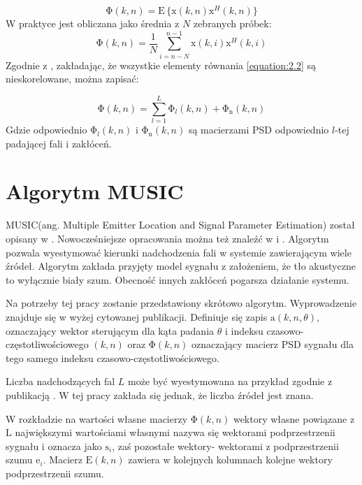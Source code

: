 \begin{equation}
    \label{equation:PSD matrix}
    \bm{\mathrm{\Phi}}(k,n) = \mathrm{E} \, \{\bm{\mathrm{x}}(k,n) \bm{\mathrm{x}}^{H}(k,n)\}
\end{equation}
W praktyce jest obliczana jako średnia z $N$ zebranych próbek:
\begin{equation}
    \label{equation: PSD in practice}
    \bm{\mathrm{\Phi}}(k,n)=
    \dfrac{1}{N} \sum_{i = n-N}^{n-1}
    \bm{\mathrm{x}}(k,i) \bm{\mathrm{x}}^{H}(k,i)
\end{equation}
Zgodnie z \cite{Thiergart2013}, zakładając, że wszystkie elementy równania \eqref{equation:2.2} są nieskorelowane, można zapisać:

\begin{equation}
    \label{equation:PSD signal noise}
    \bm{\mathrm{\Phi}}(k,n) = 
    \sum_{l=1}^{L} \bm{\mathrm{\Phi}}_{l}(k,n) +
    \bm{\mathrm{\Phi}}_{\mathrm{n}}(k,n)
\end{equation}
Gdzie odpowiednio $\bm{\mathrm{\Phi}}_{l}(k,n)$ i $\bm{\mathrm{\Phi}}_{\mathrm{n}}(k,n)$ są macierzami PSD odpowiednio $l$-tej padającej fali i zakłóceń.

\section{Algorytm MUSIC}

MUSIC(ang. Multiple Emitter Location and Signal Parameter Estimation) został opisany w \cite{Schmidt1986}. Nowocześniejsze opracowania można też znaleźć w \cite{DOA} i \cite{Benesty2008}. Algorytm pozwala wyestymować kierunki nadchodzenia fali w systemie zawierającym wiele źródeł. Algorytm zakłada przyjęty model sygnału z założeniem, że tło akustyczne to wyłącznie biały szum. Obecność innych zakłóceń pogarsza działanie systemu.

\noindent Na potrzeby tej pracy zostanie przedstawiony skrótowo algorytm. Wyprowadzenie znajduje się w wyżej cytowanej publikacji. 
Definiuje się zapis $\bm{\mathrm{a}}(k,n,\theta)$, oznaczający wektor sterującym dla kąta padania $\theta$ i indeksu czasowo-częstotliwościowego $(k,n)$ oraz $\bm{\mathrm{\Phi}}(k,n)$ oznaczający macierz PSD sygnału dla tego samego indeksu czasowo-częstotliwościowego.

\noindent Liczba nadchodzących fal $L$ może być wyestymowana na przykład zgodnie z publikacją \cite{n_src}. W tej pracy zakłada się jednak, że liczba źródeł jest znana.

\noindent W rozkładzie na wartości własne macierzy $\bm{\mathrm{\Phi}}(k,n)$ wektory własne powiązane z L największymi wartościami własnymi nazywa się wektorami podprzestrzenii sygnału i oznacza jako $\bm{\mathrm{s}}_{i}$, zaś pozostałe wektory- wektorami z podprzestrzenii szumu $\bm{\mathrm{e}}_{i}$. Macierz $\bm{\mathrm{E}}(k,n)$ zawiera w kolejnych kolumnach kolejne wektory podprzestrzenii szumu.

